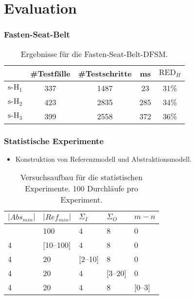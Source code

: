 \section{Evaluation}

\begin{frame}
  \frametitle{Fasten-Seat-Belt}
  \begin{table}[]
    \caption{Ergebnisse für die \glqq Fasten-Seat-Belt\grqq-DFSM.}
    \label{tab:fsbrtsx}
    \centering
    \begin{tabular}{|ccccc|}
    \hline
          & \#Testfälle & \#Testschritte & ms & $\text{RED}_H$\\ \hline\hline
        $\text{s-H}_1$ & 337         & 1487    &    23   &  31\% \\ \hline
    $\text{s-H}_2$ & 423         & 2835    &    285  & 34\%  \\ \hline
    $\text{s-H}_3$ & 399         & 2558    &    372   &  36\% \\ \hline
    \end{tabular}
\end{table}
\end{frame} 

\begin{frame}
  \frametitle{Statistische Experimente}
  \begin{itemize}
    \item Konstruktion von Referenzmodell und Abstraktionsmodell.
  \end{itemize}
  \begin{table}[]
    \centering
    \begin{tabular}{|l|l|l|l|l|}
    \hline
    \textbf{$|Abs_{min}|$} & \textbf{$|Ref_{min}|$} & \textbf{$\Sigma_I$}   & \textbf{$\Sigma_O$}  & \textbf{$m-n$}   \\ \hline
    [2--99]     & 100        & 4      & 8      & 0 \\ \hline
    4          & [10--100]   & 4      & 8      & 0 \\ \hline
    4          & 20         & [2--10] & 8      & 0 \\ \hline
    4          & 20         & 4      & [3--20] & 0 \\ \hline
    4          & 20         & 4      & 8      & [0--3] \\ \hline
    \end{tabular}
    \caption{Versuchsaufbau für die statistischen Experimente. 100 Durchläufe pro Experiment.}
\end{table}
\end{frame}


